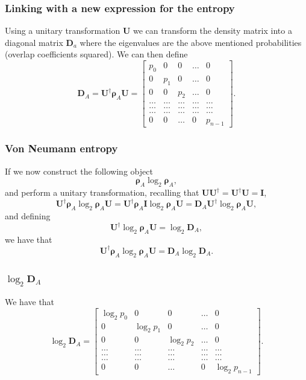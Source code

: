 \documentclass{beamer}
\begin{document}
\begin{frame}
\frametitle{Linking with a new expression for the entropy}

Using a unitary transformation $\bm{U}$ we can transform the density
matrix into a diagonal matrix $\bm{D}_a$ where the eigenvalues are the
above mentioned probabilities (overlap coefficients squared). We can then define
\[
\bm{D}_A=\bm{U}^{\dagger}\bm{\rho}_A\bm{U}=\begin{bmatrix} p_0 & 0 & 0 & \dots & 0\\
 0 & p_1 & 0 & \dots & 0\\
 0 & 0 & p_2 & \dots & 0\\
\dots & \dots & \dots & \dots & \dots\\
\dots & \dots & \dots & \dots & \dots\\
\dots & \dots & \dots & \dots & \dots\\
0 & 0 & \dots & 0 & p_{n-1}\end{bmatrix}.
\]
\end{frame}

\begin{frame}
\frametitle{Von Neumann entropy}

If we now construct the following object
\[
\bm{\rho}_A\log_2{\bm{\rho}_A},
\]
and perform a unitary transformation, recalling that $\bm{U}\bm{U}^{\dagger}=\bm{U}^{\dagger}\bm{U}=\bm{I}$,
\[
\bm{U}^{\dagger}\bm{\rho}_A\log_2{\bm{\rho}_A}\bm{U}=\bm{U}^{\dagger}\bm{\rho}_A\bm{I}\log_2{\bm{\rho}_A}\bm{U}=\bm{D}_A\bm{U}^{\dagger}\log_2{\bm{\rho}_A}\bm{U},
\]
and defining
\[
\bm{U}^{\dagger}\log_2{\bm{\rho}_A}\bm{U}=\log_2{\bm{D}_A},
\]
we have that 
\[
\bm{U}^{\dagger}\bm{\rho}_A\log_2{\bm{\rho}_A}\bm{U}=\bm{D}_A \log_2{\bm{D}_A}.
\]
\end{frame}

\begin{frame}
\frametitle{$\log_2{\bm{D}_A}$}

We have that
\[
\log_2{\bm{D}_A}=\begin{bmatrix} \log_2{p_0} & 0 & 0 & \dots & 0\\
 0 & \log_2{p_1} & 0 & \dots & 0\\
 0 & 0 & \log_2{p_2} & \dots & 0\\
\dots & \dots & \dots & \dots & \dots\\
\dots & \dots & \dots & \dots & \dots\\
\dots & \dots & \dots & \dots & \dots\\
0 & 0 & \dots & 0 & \log_2{p_{n-1}}\end{bmatrix}.
\]
\end{frame}
\end{document}
